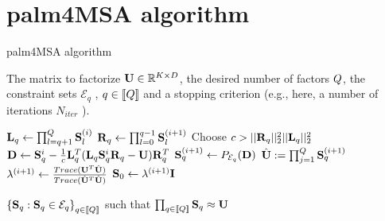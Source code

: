 \section{palm4MSA algorithm}
\label{sec:app:palm4msa}

\begin{algorithm}
	\caption{palm4MSA algorithm}
	\label{algo:palm4msa}
	\begin{algorithmic}[1]
		
		
		\REQUIRE The matrix to factorize ${\mathbf{U}} \in \mathbb{R}^{K \times D}$, the desired number of factors $Q$, the constraint sets $\mathcal{E}_q$ , $q\in [\![Q]\!]$ and a stopping criterion (e.g., here, a number of iterations $N_{iter}$ ).
		
		
		\STATE  ${\mathbf{L}}_q \leftarrow \prod_{l=q+1}^{Q} {\mathbf{S}}_{l}^{(i)}$
		\STATE  ${\mathbf{R}}_q \leftarrow \prod_{l=0}^{q-1} {\mathbf{S}}_{l}^{(i+1)}$
		\STATE Choose $c > ||{\mathbf{R}}_q||_2^2 ||{\mathbf{L}}_q||_2^2$
		\STATE ${\mathbf{D}} \leftarrow {\mathbf{S}}_q^i - \frac{1}{c} {\mathbf{L}}_q^T({\mathbf{L}}_q {\mathbf{S}}_q^i {\mathbf{R}}_q - {\mathbf{U}}){\mathbf{R}}_q^T$
		\STATE ${\mathbf{S}}^{(i+1)}_q \leftarrow P_{\mathcal{E}_q}({\mathbf{D}})$
		\ENDFOR
		\STATE $\hat {{\mathbf{U}}} := \prod_{j=1}^{Q} {\mathbf{S}}_q^{(i+1)}$
		\STATE $\lambda^{(i+1)} \leftarrow \frac{Trace({\mathbf{U}}^T\hat{{\mathbf{U}}})}{Trace(\hat{{\mathbf{U}}}^T\hat{{\mathbf{U}}})}$
		\STATE ${\mathbf{S}}_0 \leftarrow \lambda^{(i+1)} {\mathbf{I}}$
		\ENDFOR
		
		\ENSURE $\left \lbrace {\mathbf{S}}_q : {\mathbf{S}}_q \in \mathcal{E}_q\right \rbrace_{q\in[\![Q]\!]}$ such that $\prod_{q\in[\![Q]\!]}{\mathbf{S}}_q \approx {\mathbf{U}}$
		
	\end{algorithmic}
\end{algorithm}

